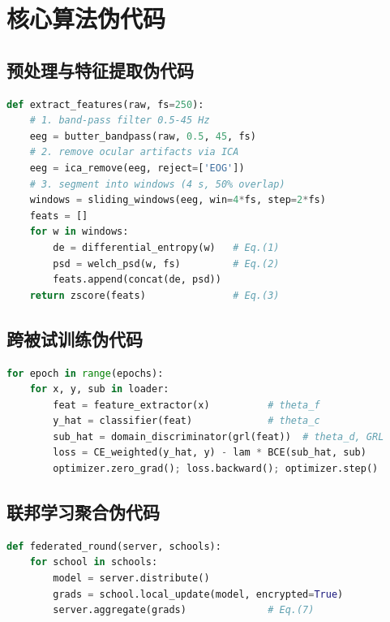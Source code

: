 \documentclass[zihao=-4,fontset=windows,a4paper]{ctexart}
\begin{document}
\newpage
\appendix
\renewcommand{\thesection}{附录\Alph{section}}
\ctexset{section={number=\thesection}}
\section{核心算法伪代码}

\subsection{预处理与特征提取伪代码}

\begin{lstlisting}[language=Python,caption=EEG preprocessing and feature extraction]
def extract_features(raw, fs=250):
    # 1. band-pass filter 0.5-45 Hz
    eeg = butter_bandpass(raw, 0.5, 45, fs)
    # 2. remove ocular artifacts via ICA
    eeg = ica_remove(eeg, reject=['EOG'])
    # 3. segment into windows (4 s, 50% overlap)
    windows = sliding_windows(eeg, win=4*fs, step=2*fs)
    feats = []
    for w in windows:
        de = differential_entropy(w)   # Eq.(1)
        psd = welch_psd(w, fs)         # Eq.(2)
        feats.append(concat(de, psd))
    return zscore(feats)               # Eq.(3)
\end{lstlisting}

\subsection{跨被试训练伪代码}

\begin{lstlisting}[language=Python,caption=Cross-subject adversarial training]
for epoch in range(epochs):
    for x, y, sub in loader:
        feat = feature_extractor(x)          # theta_f
        y_hat = classifier(feat)             # theta_c
        sub_hat = domain_discriminator(grl(feat))  # theta_d, GRL
        loss = CE_weighted(y_hat, y) - lam * BCE(sub_hat, sub)
        optimizer.zero_grad(); loss.backward(); optimizer.step()
\end{lstlisting}

\subsection{联邦学习聚合伪代码}

\begin{lstlisting}[language=Python,caption=Federated averaging]
def federated_round(server, schools):
    for school in schools:
        model = server.distribute()
        grads = school.local_update(model, encrypted=True)
        server.aggregate(grads)              # Eq.(7)
\end{lstlisting}
\end{document}
